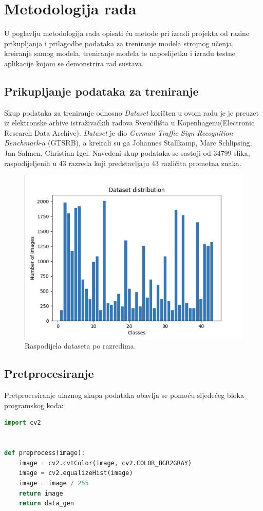 \documentclass[times, utf8, zavrsni]{fer}
\begin{document}
\chapter{Metodologija rada}
U poglavlju metodologija rada opisati ću metode pri izradi projekta od razine prikupljanja i prilagodbe podataka za treniranje modela strojnog učenja, kreiranje samog modela, treniranje modela te naposlijetku i izradu testne aplikacije kojom se demonstrira rad sustava.
\pagebreak
\section{Prikupljanje podataka za treniranje}
Skup podataka za treniranje odnosno
\emph{Dataset} korišten u ovom radu je je preuzet iz elektronske arhive istraživačkih radova Sveučilišta u Kopenhagenu(Electronic Research Data Archive).
\emph{Dataset} je dio \emph{German Traffic Sign Recognition Benchmark}-a (GTSRB), a kreirali su ga Johannes Stallkamp, Marc Schlipsing, Jan Salmen, Christian Igel.
Navedeni skup podataka se sastoji od 34799 slika, raspodijeljenih u 43 razreda koji predstavljaju 43 različita prometna znaka.

\begin{figure}[h!]
  \includegraphics[width=\linewidth,trim=4 4 4 4,clip]{images/distribution.jpeg}
  \caption{Raspodijela dataseta po razredima.}
\end{figure}
\pagebreak
\section{Pretprocesiranje}
Pretprocesiranje ulaznog skupa podataka obavlja se pomoću sljedećeg bloka programskog koda:
\begin{lstlisting}[language=Python]
import cv2


def preprocess(image):
    image = cv2.cvtColor(image, cv2.COLOR_BGR2GRAY)
    image = cv2.equalizeHist(image)
    image = image / 255
    return image
    return data_gen
\end{lstlisting}
\end{document}
